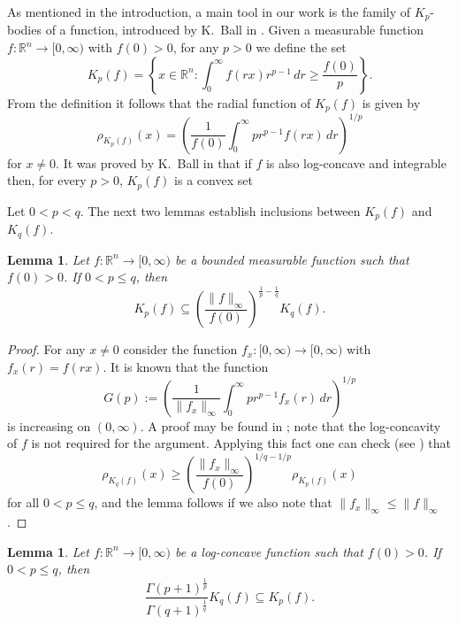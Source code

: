 \documentclass[11pt,leqno]{article}
\newtheorem{lemma}[theorem]{Lemma}
\theoremstyle{definition}
\theoremstyle{remark}
\numberwithin{equation}{section}
\newcommand{\ls}{\leqslant}
\newcommand{\gr}{\geqslant}
\newcommand{\1}{\textbf{1}}
\begin{document}
As mentioned in the introduction, a main tool in our work is the family of $K_p$-bodies of a function,
introduced by K.~Ball in \cite{Ball-1988}. Given a measurable function $f:\mathbb R^n\to [0,\infty)$
with $f(0) >0$, for any $p>0$ we define the set
\begin{equation}\label{eq:ball-bodies}
K_p(f)=\left\{ x\in \mathbb R^n : \int_0^\infty f(rx)r^{p-1} \, dr
\gr \frac{f(0)}{p}\right\}.
\end{equation}
From the definition it follows that the radial function of $K_p(f)$ is given by
\begin{equation}\label{eq:rho_Kp(f)}
\rho_{K_p(f)}(x)=\left (\frac{1}{f(0)}\int_0^{\infty}pr^{p-1}f(rx)\,dr\right )^{1/p}\end{equation} for $x\neq 0$.
It was proved by K.~Ball in \cite{Ball-1988} that if $f$ is also log-concave and integrable then, for every $p>0$, $K_p(f)$ is a convex set %

Let $0<p<q$. The next two lemmas establish inclusions between $K_p(f)$ and $K_q(f)$.

\begin{lemma}\label{lem:any-g}
Let $f:\mathbb R^n\to [0,\infty)$ be a bounded measurable function such that $f(0)>0$. If $0 < p\ls q$, then
\begin{equation}\label{any-g}K_{p}(f)\subseteq
\left(\frac{\|f\|_{\infty}}{f(0)}\right)^{\frac{1}{p}-\frac{1}{q}}K_{q}(f).
\end{equation}
\end{lemma}

\begin{proof}For any $x\neq 0$ consider the function $f_x:[0,\infty)\to [0,\infty)$ with $f_x(r)=f(rx)$. It is known that
the function
$$G(p):=\left(\frac{1}{\|f_x\|_{\infty}}\int_0^{\infty}pr^{p-1}f_x(r)\,dr\right)^{1/p}$$
is increasing on $(0,\infty)$. A proof may be found in \cite[Lemma~2.2.4]{BGVV-book}; note that the log-concavity
of $f$ is not required for the argument. Applying this fact one can check (see \cite[Proposition~2.5.7]{BGVV-book}) that
$$\rho_{K_q(f)}(x)\gr\left(\frac{\|f_x\|_{\infty}}{f(0)}\right)^{1/q-1/p}\rho_{K_p(f)}(x)$$
for all $0<p\ls q$, and the lemma follows if we also note that
$\|f_x\|_{\infty}\ls\|f\|_{\infty}$.\end{proof}


\begin{lemma}\label{lem:log-concave-f}
Let $f:\mathbb R^n\to [0,\infty)$ be a log-concave function such
that $f(0)>0$. If $0 < p\ls q$, then
\begin{equation}\label{log-concave-f} \frac{\Gamma(p+1)^{\frac{1}{p}}}{\Gamma(q+1)^{\frac{1}{q}}} K_q(f)\subseteq
K_{p}(f).\end{equation}
\end{lemma}
\end{document}
